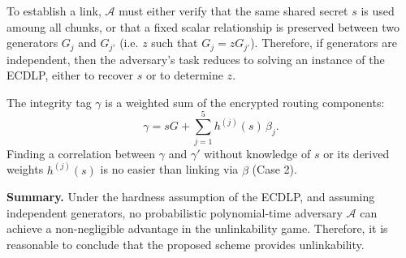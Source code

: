 To establish a link, $\mathcal{A}$ must either verify that the same shared secret $s$ is used amoung all chunks, or that a fixed scalar relationship is preserved between two generators $G_j$ and $G_{j'}$ (i.e. $z$ such that $G_j = z G_{j'}$).
Therefore, if generators are independent, then the adversary's task reduces to solving an instance of the ECDLP, either to recover $s$ or to determine $z$.
\newline

The integrity tag $\gamma$ is a weighted sum of the encrypted routing components:
$$
\gamma = s G + \sum_{j=1}^{5} h^{(j)}(s)\, \beta_j.
$$
Finding a correlation between $\gamma$ and $\gamma'$ without knowledge of $s$ or its derived weights $h^{(j)}(s)$ is no easier than linking via $\beta$ (Case 2).
\newline

\noindent\textbf{Summary.}  
Under the hardness assumption of the ECDLP, and assuming independent generators, no probabilistic polynomial-time adversary $\mathcal{A}$ can achieve a non-negligible advantage in the unlinkability game.  
Therefore, it is reasonable to conclude that the proposed scheme provides unlinkability.




